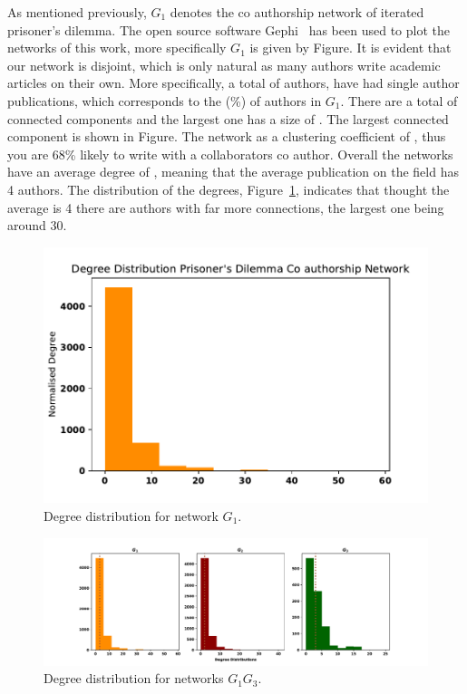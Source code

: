 \documentclass{article}
\theoremstyle{definition}
\newcommand{\isolated}{}
\newcommand{\isolatedpercentage}{}
\newcommand{\connectedcomponents}{}
\newcommand{\largestcc}{}
\newcommand{\clustering}{}
\newcommand{\avdegree}{}
\begin{document}
As mentioned previously, \(G_1\) denotes the co authorship network of iterated
prisoner's dilemma. The open source software Gephi~\cite{ICWSM09154} has been used
to plot the networks of this work, more specifically \(G_1\) is given by Figure. %
It is evident that our network is disjoint, which is only natural as many authors
write academic articles on their own. More specifically, a total of \isolated authors,
have had single author publications, which corresponds to the \isolatedpercentage (\%)
of authors in \(G_1\). There are a total of \connectedcomponents connected components
and the largest one has a size of \largestcc. The largest connected component is shown in
Figure. %
The network as a clustering coefficient of \clustering, thus you are 68\% likely
to write with a collaborators co author. Overall the networks have an average
degree of \avdegree, meaning that the average publication on the field has
4 authors. The distribution of the degrees, Figure~\ref{fig:degree_distr_pd},
indicates that thought the average is 4 there are authors with far more connections,
the largest one being around 30.

\begin{figure}[!hbtp]
    \centering
    \includegraphics[width=.5\textwidth]{./assets/images/pd_degree_distribution.pdf}
    \caption{Degree distribution for network \(G_1\).}\label{fig:degree_distr_pd}
\end{figure}

\begin{figure}[!hbtp]
    \centering
    \includegraphics[width=\textwidth]{./assets/images/networks_ditributions.pdf}
    \caption{Degree distribution for networks \(G_1\)\-\(G_3\).}\label{fig:degree_distrs}
\end{figure}
\end{document}
